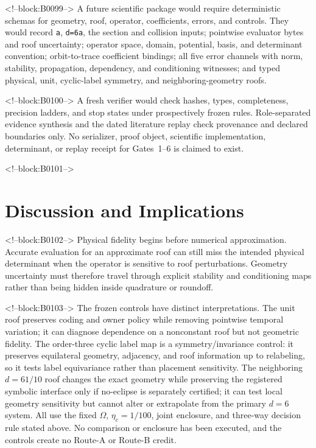 \documentclass[11pt,a4paper]{article}
\begin{document}
<!--block:B0099-->
A future scientific package would require deterministic schemas for geometry, roof, operator, coefficients, errors, and controls. They would record \texttt{a}, \texttt{d=6a}, the section and collision inputs; pointwise evaluator bytes and roof uncertainty; operator space, domain, potential, basis, and determinant convention; orbit-to-trace coefficient bindings; all five error channels with norm, stability, propagation, dependency, and conditioning witnesses; and typed physical, unit, cyclic-label symmetry, and neighboring-geometry roofs.

<!--block:B0100-->
A fresh verifier would check hashes, types, completeness, precision ladders,
and stop states under prospectively frozen rules.  Role-separated evidence
synthesis and the dated literature replay check provenance and declared
boundaries only.  No serializer, proof object, scientific implementation,
determinant, or replay receipt for Gates~1--6 is claimed to exist.

<!--block:B0101-->
\section{Discussion and Implications}

<!--block:B0102-->
Physical fidelity begins before numerical approximation. Accurate evaluation for an approximate roof can still miss the intended physical determinant when the operator is sensitive to roof perturbations. Geometry uncertainty must therefore travel through explicit stability and conditioning maps rather than being hidden inside quadrature or roundoff.

<!--block:B0103-->
The frozen controls have distinct interpretations.  The unit roof preserves
coding and owner policy while removing pointwise temporal variation; it can
diagnose dependence on a nonconstant roof but not geometric fidelity.  The
order-three cyclic label map is a symmetry/invariance control: it preserves
equilateral geometry, adjacency, and roof information up to relabeling, so it
tests label equivariance rather than placement sensitivity.  The neighboring
\(d=61/10\) roof changes the exact geometry while preserving the registered
symbolic interface only if no-eclipse is separately certified; it can test local
geometry sensitivity but cannot alter or extrapolate from the primary \(d=6\)
system.  All use the fixed \(\Omega\), \(\eta_c=1/100\), joint enclosure, and
three-way decision rule stated above.  No comparison or enclosure has been
executed, and the controls create no Route-A or Route-B credit.
\end{document}

